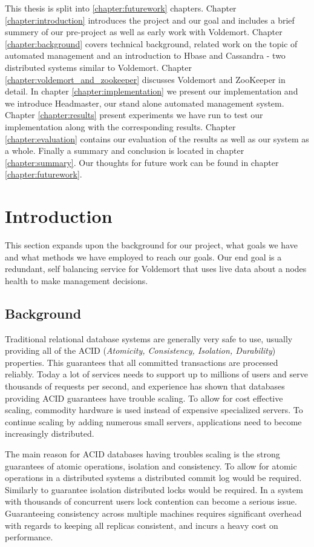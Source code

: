 
This thesis is split into \ref{chapter:futurework} chapters. Chapter \ref{chapter:introduction} introduces the project and our goal and includes a brief summery of our pre-project as well as early work with Voldemort. Chapter \ref{chapter:background} covers technical background, related work on the topic of automated management and an introduction to Hbase and Cassandra - two distributed systems similar to Voldemort. Chapter \ref{chapter:voldemort_and_zookeeper} discusses Voldemort and ZooKeeper in detail. In chapter \ref{chapter:implementation} we present our implementation and we introduce Headmaster, our stand alone automated management system. Chapter \ref{chapter:results} present experiments we have run to test our implementation along with the corresponding results. Chapter \ref{chapter:evaluation} contains our evaluation of the results as well as our system as a whole. Finally a summary and conclusion is located in chapter \ref{chapter:summary}. Our thoughts for future work can be found in chapter \ref{chapter:futurework}. 

\section{Introduction}
This section expands upon the background for our project, what goals we have and what methods we have employed to reach our goals. 
Our end goal is a redundant, self balancing service for Voldemort that uses live data about a nodes health to make management decisions.

\subsection{Background}
Traditional relational database systems are generally very safe to use, usually providing all of the ACID (\emph{Atomicity, Consistency, Isolation, Durability}) properties.
This guarantees that all committed transactions are processed reliably. 
Today a lot of services needs to support up to millions of users and serve thousands of requests per second, and experience has shown that databases providing ACID guarantees have trouble scaling. 
To allow for cost effective scaling, commodity hardware is used instead of expensive specialized servers. To continue scaling by adding numerous small servers, applications need to become increasingly distributed.

The main reason for ACID databases having troubles scaling is the strong guarantees of atomic operations, isolation and consistency. 
To allow for atomic operations in a distributed systems a distributed commit log would be required. 
Similarly to guarantee isolation distributed locks would be required. In a system with thousands of concurrent users lock contention can become a serious issue. 
Guaranteeing consistency across multiple machines requires significant overhead with regards to keeping all replicas consistent, and incurs a heavy cost on performance. 

